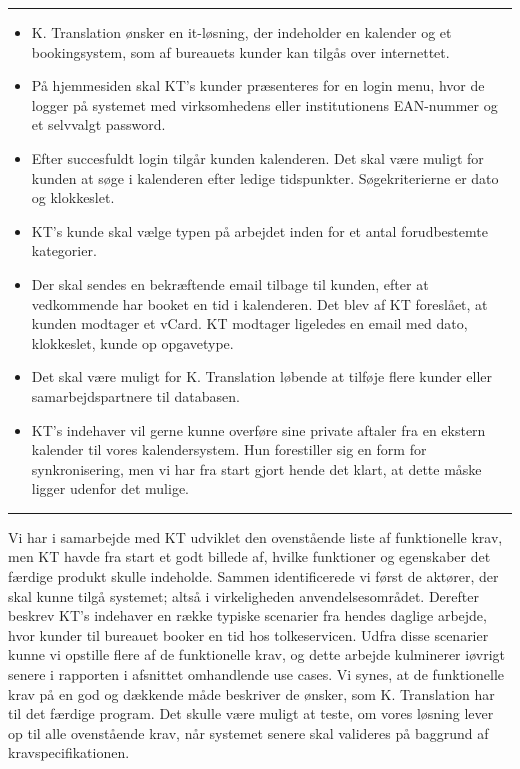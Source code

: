 \documentclass[12pt]{article}   %
\begin{document}
\rule{120mm}{1mm}
\begin{itemize}
\item K. Translation ønsker en it-løsning, der indeholder en kalender og et
	bookingsystem, som af bureauets kunder kan tilgås over internettet.
\item På hjemmesiden skal KT's kunder præsenteres for en login menu, hvor de
	logger på systemet med virksomhedens eller institutionens EAN-nummer
	og et selvvalgt password. 
\item Efter succesfuldt login tilgår kunden kalenderen. Det skal være muligt
	for kunden at søge i kalenderen efter ledige tidspunkter.
	Søgekriterierne er dato og klokkeslet. 
\item KT's kunde skal vælge typen på arbejdet inden for et antal forudbestemte
	kategorier.
\item Der skal sendes en bekræftende email tilbage til kunden, efter at
	vedkommende har booket en tid i kalenderen. Det blev af KT foreslået,
	at kunden modtager et vCard. KT modtager ligeledes en email med dato,
	klokkeslet, kunde op opgavetype.
\item Det skal være muligt for K. Translation løbende at tilføje flere kunder 
	eller samarbejdspartnere til databasen. 
\item KT's indehaver vil gerne kunne overføre sine private aftaler fra en
	ekstern kalender til vores kalendersystem. Hun forestiller sig en form
	for synkronisering, men vi har fra start gjort hende det klart, at
	dette måske ligger udenfor det mulige. 
\end{itemize}
\rule{120mm}{1mm}
\vspace{0.5cm}

Vi har i samarbejde med KT udviklet den ovenstående liste af funktionelle
krav, men KT havde fra start et godt billede af, hvilke funktioner og egenskaber det
færdige produkt skulle indeholde. Sammen identificerede vi først de aktører, der skal 
kunne tilgå systemet; altså i virkeligheden anvendelsesområdet. Derefter
beskrev KT's indehaver en række typiske scenarier fra hendes daglige arbejde,
hvor kunder til bureauet booker en tid hos tolkeservicen. Udfra disse
scenarier kunne vi opstille flere af de funktionelle krav, og dette arbejde
kulminerer iøvrigt senere i rapporten i afsnittet omhandlende use cases. Vi
synes, at de funktionelle krav på en god og dækkende måde beskriver de
ønsker, som K. Translation har til det færdige program. Det skulle være
muligt at teste, om vores løsning lever op til alle ovenstående krav, når
systemet senere skal valideres på baggrund af kravspecifikationen.  \\ 
\end{document}
